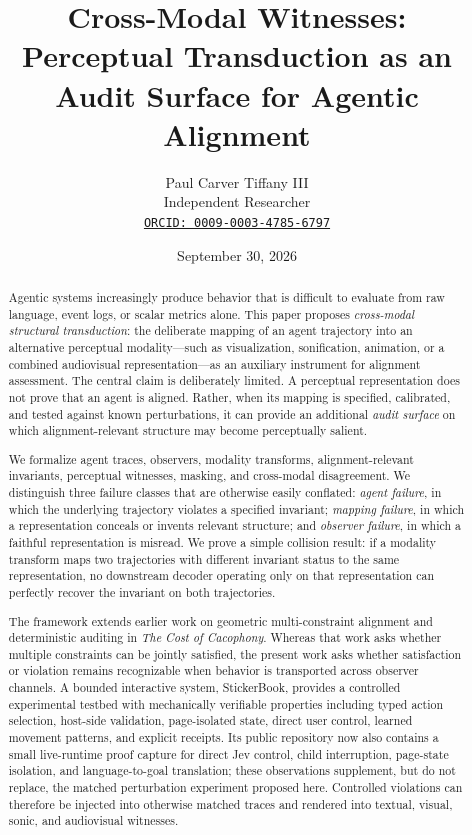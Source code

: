 \documentclass[11pt]{article}
\title{\textbf{Cross-Modal Witnesses:}\\
Perceptual Transduction as an Audit Surface for Agentic Alignment}
\author{Paul Carver Tiffany III\\Independent Researcher\\\href{https://orcid.org/0009-0003-4785-6797}{\texttt{ORCID: 0009-0003-4785-6797}}}
\date{September 30, 2026}
\begin{document}
\maketitle

\begin{abstract}
Agentic systems increasingly produce behavior that is difficult to evaluate from raw language, event logs, or scalar metrics alone. This paper proposes \emph{cross-modal structural transduction}: the deliberate mapping of an agent trajectory into an alternative perceptual modality---such as visualization, sonification, animation, or a combined audiovisual representation---as an auxiliary instrument for alignment assessment. The central claim is deliberately limited. A perceptual representation does not prove that an agent is aligned. Rather, when its mapping is specified, calibrated, and tested against known perturbations, it can provide an additional \emph{audit surface} on which alignment-relevant structure may become perceptually salient.

We formalize agent traces, observers, modality transforms, alignment-relevant invariants, perceptual witnesses, masking, and cross-modal disagreement. We distinguish three failure classes that are otherwise easily conflated: \emph{agent failure}, in which the underlying trajectory violates a specified invariant; \emph{mapping failure}, in which a representation conceals or invents relevant structure; and \emph{observer failure}, in which a faithful representation is misread. We prove a simple collision result: if a modality transform maps two trajectories with different invariant status to the same representation, no downstream decoder operating only on that representation can perfectly recover the invariant on both trajectories.

The framework extends earlier work on geometric multi-constraint alignment and deterministic auditing in \emph{The Cost of Cacophony}. Whereas that work asks whether multiple constraints can be jointly satisfied, the present work asks whether satisfaction or violation remains recognizable when behavior is transported across observer channels. A bounded interactive system, StickerBook, provides a controlled experimental testbed with mechanically verifiable properties including typed action selection, host-side validation, page-isolated state, direct user control, learned movement patterns, and explicit receipts. Its public repository now also contains a small live-runtime proof capture for direct Jev control, child interruption, page-state isolation, and language-to-goal translation; these observations supplement, but do not replace, the matched perturbation experiment proposed here. Controlled violations can therefore be injected into otherwise matched traces and rendered into textual, visual, sonic, and audiovisual witnesses.


\end{abstract}
\end{document}
